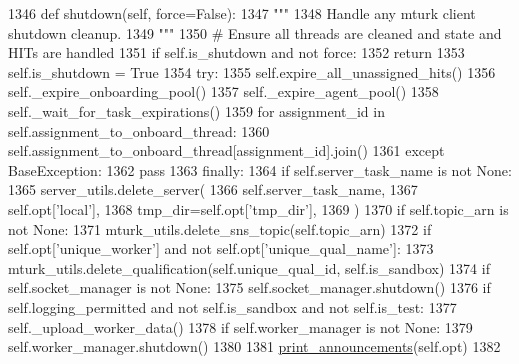 \begin{DoxyCode}
1346     \textcolor{keyword}{def }shutdown(self, force=False):
1347         \textcolor{stringliteral}{"""}
1348 \textcolor{stringliteral}{        Handle any mturk client shutdown cleanup.}
1349 \textcolor{stringliteral}{        """}
1350         \textcolor{comment}{# Ensure all threads are cleaned and state and HITs are handled}
1351         \textcolor{keywordflow}{if} self.is\_shutdown \textcolor{keywordflow}{and} \textcolor{keywordflow}{not} force:
1352             \textcolor{keywordflow}{return}
1353         self.is\_shutdown = \textcolor{keyword}{True}
1354         \textcolor{keywordflow}{try}:
1355             self.expire\_all\_unassigned\_hits()
1356             self.\_expire\_onboarding\_pool()
1357             self.\_expire\_agent\_pool()
1358             self.\_wait\_for\_task\_expirations()
1359             \textcolor{keywordflow}{for} assignment\_id \textcolor{keywordflow}{in} self.assignment\_to\_onboard\_thread:
1360                 self.assignment\_to\_onboard\_thread[assignment\_id].join()
1361         \textcolor{keywordflow}{except} BaseException:
1362             \textcolor{keywordflow}{pass}
1363         \textcolor{keywordflow}{finally}:
1364             \textcolor{keywordflow}{if} self.server\_task\_name \textcolor{keywordflow}{is} \textcolor{keywordflow}{not} \textcolor{keywordtype}{None}:
1365                 server\_utils.delete\_server(
1366                     self.server\_task\_name,
1367                     self.opt[\textcolor{stringliteral}{'local'}],
1368                     tmp\_dir=self.opt[\textcolor{stringliteral}{'tmp\_dir'}],
1369                 )
1370             \textcolor{keywordflow}{if} self.topic\_arn \textcolor{keywordflow}{is} \textcolor{keywordflow}{not} \textcolor{keywordtype}{None}:
1371                 mturk\_utils.delete\_sns\_topic(self.topic\_arn)
1372             \textcolor{keywordflow}{if} self.opt[\textcolor{stringliteral}{'unique\_worker'}] \textcolor{keywordflow}{and} \textcolor{keywordflow}{not} self.opt[\textcolor{stringliteral}{'unique\_qual\_name'}]:
1373                 mturk\_utils.delete\_qualification(self.unique\_qual\_id, self.is\_sandbox)
1374             \textcolor{keywordflow}{if} self.socket\_manager \textcolor{keywordflow}{is} \textcolor{keywordflow}{not} \textcolor{keywordtype}{None}:
1375                 self.socket\_manager.shutdown()
1376             \textcolor{keywordflow}{if} self.logging\_permitted \textcolor{keywordflow}{and} \textcolor{keywordflow}{not} self.is\_sandbox \textcolor{keywordflow}{and} \textcolor{keywordflow}{not} self.is\_test:
1377                 self.\_upload\_worker\_data()
1378             \textcolor{keywordflow}{if} self.worker\_manager \textcolor{keywordflow}{is} \textcolor{keywordflow}{not} \textcolor{keywordtype}{None}:
1379                 self.worker\_manager.shutdown()
1380 
1381             \hyperlink{namespaceparlai_1_1core_1_1params_afd1a47c94990168ea9e70d894a79bd2c}{print\_announcements}(self.opt)
1382 
\end{DoxyCode}
